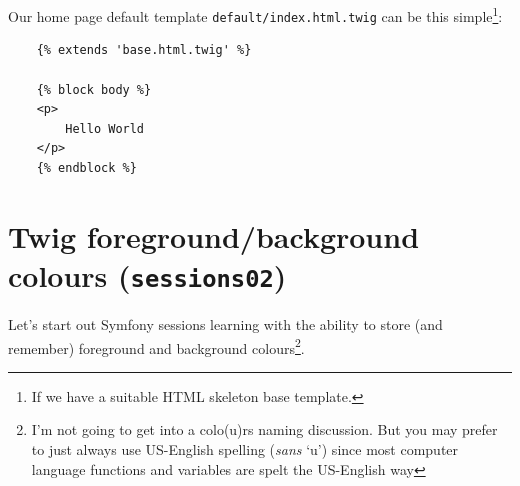 \documentclass[a4paperpaper,openright]{book}
\newenvironment{Shaded}{}{}
\newcommand{\AnnotationTok}[1]{\textcolor[rgb]{0.38,0.63,0.69}{\textbf{\textit{#1}}}}
\newcommand{\CommentTok}[1]{\textcolor[rgb]{0.38,0.63,0.69}{\textit{#1}}}
\newcommand{\KeywordTok}[1]{\textcolor[rgb]{0.00,0.44,0.13}{\textbf{#1}}}
\newcommand{\NormalTok}[1]{#1}
\newcommand{\OtherTok}[1]{\textcolor[rgb]{0.00,0.44,0.13}{#1}}
\newcommand{\StringTok}[1]{\textcolor[rgb]{0.25,0.44,0.63}{#1}}
\begin{document}
\begin{Shaded}
\end{Shaded}

Our home page default template \texttt{default/index.html.twig} can be
this simple\footnote{If we have a suitable HTML skeleton base template.}:

\begin{verbatim}
    {% extends 'base.html.twig' %}

    {% block body %}
    <p>
        Hello World
    </p>
    {% endblock %}
\end{verbatim}

\hypertarget{twig-foregroundbackground-colours-sessions02}{%
\section{\texorpdfstring{Twig foreground/background colours
(\texttt{sessions02})}{Twig foreground/background colours (sessions02)}}\label{twig-foregroundbackground-colours-sessions02}}

Let's start out Symfony sessions learning with the ability to store (and
remember) foreground and background colours\footnote{I'm not going to
  get into a colo(u)rs naming discussion. But you may prefer to just
  always use US-English spelling (\emph{sans} `u') since most computer
  language functions and variables are spelt the US-English way}.
\end{document}
